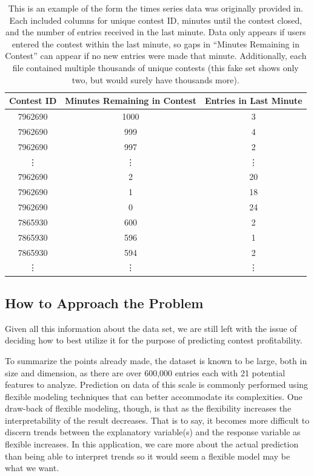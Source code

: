 \begin{table}
\centering
\begin{tabular}{| c | c | c |}
\hline
\textbf{Contest ID} & \textbf{Minutes Remaining in Contest} & \textbf{Entries in Last Minute}  \\ 
\hline
7962690 & 1000 & 3  \\  
\hline
7962690 & 999 & 4   \\
\hline
7962690 & 997 & 2   \\
\hline
\vdots & \vdots & \vdots \\
\hline
7962690 & 2 & 20   \\
\hline
7962690 & 1 & 18   \\
\hline
7962690 & 0 & 24   \\
\hline
7865930 & 600 & 2  \\  
\hline
7865930 & 596 & 1   \\
\hline
7865930 & 594 & 2   \\
\hline
\vdots & \vdots & \vdots \\
\hline
\end{tabular}
\caption{This is an example of the form the times series data was originally provided in. Each included columns for unique contest ID, minutes until the contest closed, and the number of entries received in the last minute. Data only appears if users entered the contest within the last minute, so gaps in ``Minutes Remaining in Contest'' can appear if no new entries were made that minute. Additionally, each file contained multiple thousands of unique contests (this fake set shows only two, but would surely have thousands more).}
\label{tab:series}
\end{table}

\subsection{How to Approach the Problem}
Given all this information about the data set, we are still left with the issue of deciding how to best utilize it for the purpose of predicting contest profitability. 

To summarize the points already made, the dataset is known to be large, both in size and dimension, as there are over 600,000 entries each with 21 potential features to analyze. Prediction on data of this scale is commonly performed using flexible modeling techniques that can better accommodate its complexities. One draw-back of flexible modeling, though, is that as the flexibility increases the interpretability of the result decreases. That is to say, it becomes more difficult to discern trends between the explanatory variable(s) and the response variable as flexible increases. In this application, we care more about the actual prediction than being able to interpret trends so it would seem a flexible model may be what we want.

